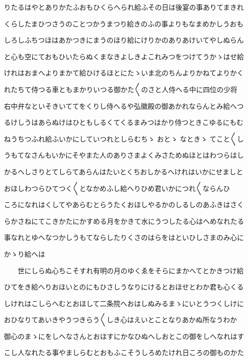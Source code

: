 \documentclass[a4paper,11pt,landscape]{ltjtarticle}
\begin{document}
\par\medskip
りたるはやとありかたふおもひくらへられ給ふその日は後宴の事ありてまきれ
\par\medskip
くらしたまひつさうのことつかうまつり給きのふの事よりもなまめかしうおも
\par\medskip
しろしふちつほはあかつきにまうのほり給にけりかのありあけいてやしぬらん
\par\medskip
と心も空にておもひいたらぬくまなきよしきよこれみつをつけてうかゝはせ給
\par\medskip
けれはおまへよりまかて給ひけるほとにたゝいま北のちんよりかねてよりかく
\par\medskip
れたちて侍つる車ともまかりいつる御かた〱のさと人侍へる中に四位の少将
\par\medskip
右中弁なといそきいててをくりし侍へるや弘徽殿の御あかれならんとみ給へつ
\par\medskip
るけしうはあらぬけはひともしるくてくるまみつはかり侍つときこゆるにもむ
\par\medskip
ねうちつふれ給ふいかにしていつれとしらむちゝ おとゝ なときゝ てこと〱し
\par\medskip
うもてなさんもいかにそやまた人のありさまよくみさためぬほとはわつらはし
\par\medskip
かるへしさりとてしらてあらんはたいとくちおしかるへけれはいかにせましと
\par\medskip
おほしわつらひてつく〱となかめふし給へりひめ君いかにつれ〱ならんひ
\par\medskip
ころになれはくしてやあらむとらうたくおほしやるかのしるしのあふきはさく
\par\medskip
らかさねにてこきかたにかすめる月をかきて水にうつしたる心はへめなれたる
\par\medskip
事なれとゆへなつかしうもてならしたりくさのはらをはといひしさまのみ心に
\par\medskip
かゝり給へは
\par\medskip
　　世にしらぬ心ちこそすれ有明の月のゆくゑをそらにまかへてとかきつけ給
\par\medskip
ひてをき給へりおほいとのにもひさしうなりにけるとおほせとわか君も心くる
\par\medskip
しけれはこしらへむとおほして二条院へおはしぬみるまゝにいとうつくしけに
\par\medskip
おひなりてあいきやうつきらう〱しき心はえいとことなりあかぬ所なうわか
\par\medskip
御心のまゝにをしへなさんとおほすにかなひぬへしおとこの御をしへなれはす
\par\medskip
こし人なれたる事やましらむとおもふこそうしろめたけれ日ころの御ものかた
\end{document}
